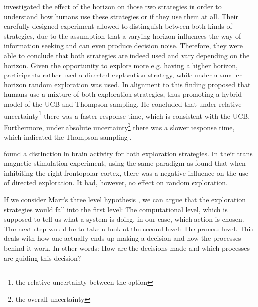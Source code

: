 \cite{wilson2014humans} investigated the effect of the horizon on those two strategies in order to understand how humans use these strategies or if they use them at all. Their carefully designed experiment allowed to distinguish between both kinds of strategies, due to the assumption that a varying horizon influences the way of information seeking and can even produce decision noise. Therefore, they were able to conclude that both strategies are indeed used and vary depending on the horizon. Given the opportunity to explore more e.g. having a higher horizon, participants rather used a directed exploration strategy, while under a smaller horizon random exploration was used.
In alignment to this finding \cite{gershman2018deconstructing} proposed that humans use a mixture of both exploration strategies, thus promoting a hybrid model of the UCB and Thompson sampling. He concluded that under relative uncertainty\footnote{the relative uncertainty between the option} there was a faster response time, which is consistent with the UCB. Furthermore, under absolute uncertainty\footnote{the overall uncertainty} there was a slower response time, which indicated the Thompson sampling \cite{gershman2018uncertainty}.

\cite{zajkowski2017causal} found a distinction in brain activity for both exploration strategies. In their trans magnetic stimulation experiment, using the same paradigm as \cite{wilson2014humans} found that when inhibiting the right frontopolar cortex, there was a negative influence on the use of directed exploration. It had, however, no effect on random exploration.

If we consider Marr's three level hypothesis \citep{marr1976understanding}, we can argue that the exploration strategies would fall into the first level: The computational level, which is supposed to tell us what a system is doing, in our case, which action is chosen. The next step would be to take a look at the second level: The process level. This deals with how one actually ends up making a decision and how the processes behind it work. In other words: How are the decisions made and which processes are guiding this decision? 

